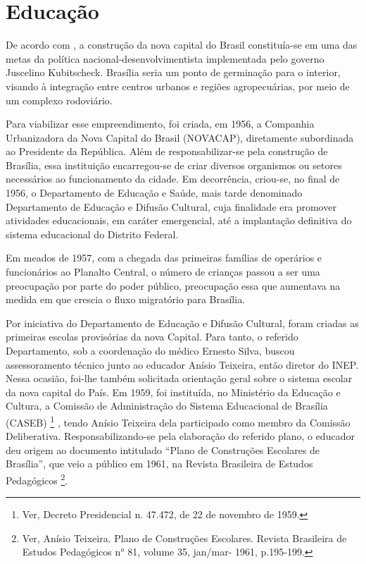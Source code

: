\section{Educação}

De acordo com , a construção da nova capital do Brasil constituía-se em uma das metas da
política nacional-desenvolvimentista implementada pelo governo Juscelino
Kubitscheck. Brasília seria um ponto de germinação para o interior, visando à
integração entre centros urbanos e regiões agropecuárias, por meio de um complexo
rodoviário.

Para viabilizar esse empreendimento, foi criada, em 1956, a Companhia
Urbanizadora da Nova Capital do Brasil (NOVACAP), diretamente subordinada ao
Presidente da República. Além de responsabilizar-se pela construção de Brasília, essa
instituição encarregou-se de criar diversos organismos ou setores necessários ao
funcionamento da cidade. Em decorrência, criou-se, no final de 1956, o Departamento
de Educação e Saúde, mais tarde denominado Departamento de Educação e Difusão
Cultural, cuja finalidade era promover atividades educacionais, em caráter emergencial,
até a implantação definitiva do sistema educacional do Distrito Federal.

Em meados de 1957, com a chegada das primeiras famílias de operários e
funcionários ao Planalto Central, o número de crianças passou a ser uma preocupação
por parte do poder público, preocupação essa que aumentava na medida em que crescia
o fluxo migratório para Brasília.

Por iniciativa do Departamento de Educação e Difusão Cultural, foram criadas
as primeiras escolas provisórias da nova Capital. Para tanto, o referido Departamento,
sob a coordenação do médico Ernesto Silva, buscou assessoramento técnico junto ao
educador Anísio Teixeira, então diretor do INEP. Nessa ocasião, foi-lhe também
solicitada orientação geral sobre o sistema escolar da nova capital do País.
Em 1959, foi instituída, no Ministério da Educação e Cultura, a Comissão de
Administração do Sistema Educacional de Brasília (CASEB) \footnote{Ver, Decreto Presidencial n. 47.472, de 22 de novembro de 1959.} , tendo Anísio Teixeira
dela participado como membro da Comissão Deliberativa. Responsabilizando-se pela
elaboração do referido plano, o educador deu origem ao documento intitulado “Plano de
Construções Escolares de Brasília”, que veio a público em 1961, na Revista Brasileira
de Estudos Pedagógicos \footnote{Ver, Anísio Teixeira. Plano de Construções Escolares. Revista Brasileira de Estudos Pedagógicos n° 81, volume 35, jan/mar- 1961, p.195-199.}.

